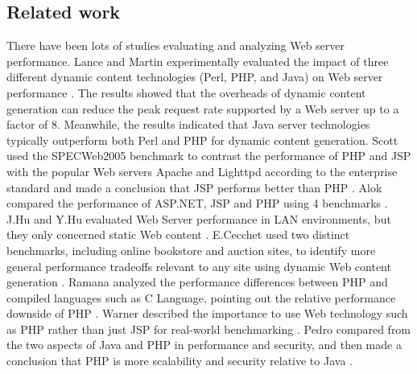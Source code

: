 \documentclass[../thesis.tex]{subfiles}
\begin{document}
\subsection{Related work}
There have been lots of studies evaluating and analyzing Web server performance. Lance and Martin experimentally evaluated the impact of three different dynamic content technologies (Perl, PHP, and Java) on Web server performance \cite{4}. The results showed that the overheads of dynamic content generation can reduce the peak request rate supported by a Web server up to a factor of 8. Meanwhile, the results indicated that Java server technologies typically outperform both Perl and PHP for dynamic content generation. Scott used the SPECWeb2005 benchmark to contrast the performance of PHP and JSP with the popular Web servers Apache and Lighttpd according to the enterprise standard and made a conclusion that JSP performs better than PHP . Alok compared the performance of ASP.NET, JSP and PHP using 4 benchmarks \cite{6}. J.Hu and Y.Hu evaluated Web Server performance in LAN environments, but they only concerned static Web content \cite{7,8}. E.Cecchet used two distinct benchmarks, including online bookstore and auction sites, to identify more general performance tradeoffs relevant to any site using dynamic Web content generation \cite{9}. Ramana analyzed the performance differences between PHP and compiled languages such as C Language, pointing out the relative performance downside of PHP \cite{10}. Warner described the importance to use Web technology such as PHP rather than just JSP for real-world benchmarking \cite{11}. Pedro compared from the two aspects of Java and PHP in performance and security, and then made a conclusion that PHP is more scalability and security relative to Java \cite{12}.
\end{document}
